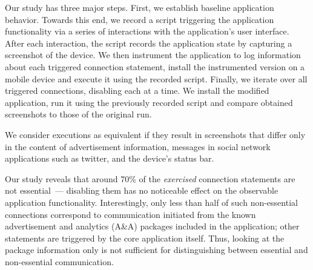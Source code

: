 Our study has three major steps. First, we establish baseline
application behavior.  Towards this end, we record a
script triggering the application functionality via a series of
interactions with the application's user interface.  After each
interaction, the script records the
application state by capturing a screenshot of the device.
We then instrument the application to log information
about each triggered connection statement, install the instrumented version on a mobile device and execute it using the recorded script.
Finally, we iterate over all triggered connections, disabling each at a time.
%
We install the modified
application, run it using the previously recorded script and compare obtained screenshots 
to those of the original run. 

We consider executions as
equivalent if they result in screenshots that differ only in the
content of advertisement information, messages in social network
applications such as twitter, and the device's status bar.  

Our study reveals that around 70\% of
the \emph{exercised} connection statements are not essential~--- disabling
them has no noticeable effect on the observable application
functionality. Interestingly, only less than half of such non-essential connections correspond to communication initiated from the known advertisement and analytics (A\&A) packages included in the application; other statements are triggered by the core application itself. 
Thus, looking at the package information only is not sufficient for distinguishing between
essential and non-essential communication. 

